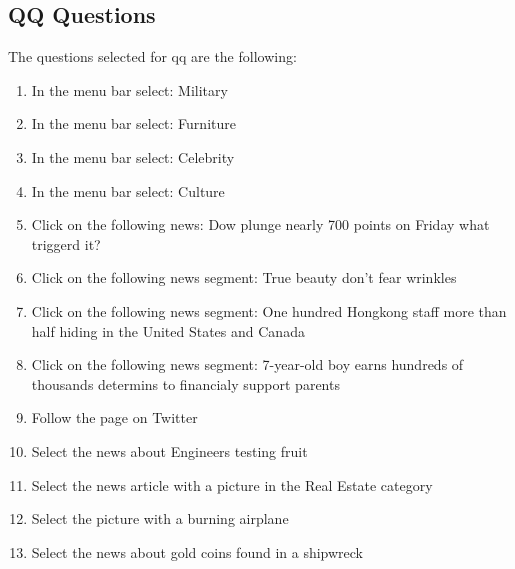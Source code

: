 \subsection{QQ Questions}
The questions selected for qq are the following:
\begin{enumerate}
	\item In the menu bar select: Military
	\item In the menu bar select: Furniture
	\item In the menu bar select: Celebrity
	\item In the menu bar select: Culture
	\item Click on the following news: Dow plunge nearly 700 points on Friday what triggerd it?
	\item Click on the following news segment: True beauty don’t fear wrinkles
	\item Click on the following news segment: One hundred Hongkong staff more than half hiding in the United States and Canada
	\item Click on the following news segment: 7-year-old boy earns hundreds of thousands determins to financialy support parents
	\item Follow the page on Twitter
	\item Select the news about Engineers testing fruit
	\item Select the news article with a picture in the Real Estate category
	\item Select the picture with a burning airplane
	\item Select the news about gold coins found in a shipwreck
\end{enumerate}
